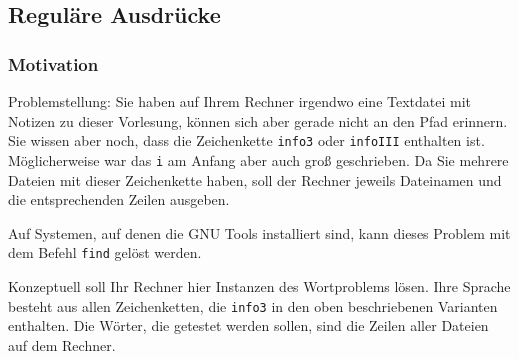 %

\renewcommand{\llbracket}{[\![}
\renewcommand{\rrbracket}{]\!]}

\subsection{Reguläre Ausdrücke}
\subsubsection{Motivation}
Problemstellung: Sie haben auf Ihrem Rechner irgendwo eine Textdatei mit Notizen zu dieser Vorlesung, können sich aber gerade nicht an den Pfad erinnern.
Sie wissen aber noch, dass die Zeichenkette \texttt{info3} oder \texttt{infoIII} enthalten ist. 
Möglicherweise war das \texttt{i} am Anfang aber auch groß geschrieben.
Da Sie mehrere Dateien mit dieser Zeichenkette haben, soll der Rechner jeweils Dateinamen und die entsprechenden Zeilen ausgeben.

Auf Systemen, auf denen die GNU Tools installiert sind, kann dieses Problem mit dem Befehl \texttt{find} gelöst werden.

Konzeptuell soll Ihr Rechner hier Instanzen des Wortproblems lösen.
Ihre Sprache besteht aus allen Zeichenketten, die \texttt{info3} in den oben beschriebenen Varianten enthalten.
Die Wörter, die getestet werden sollen, sind die Zeilen aller Dateien auf dem Rechner.

